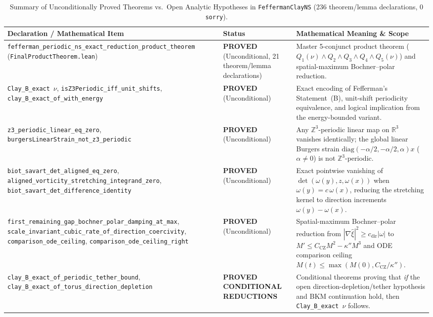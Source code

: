 \documentclass[11pt,a4paper]{article}
\theoremstyle{definition}
\begin{document}
\begin{table}[htbp]
\centering
\caption{Summary of Unconditionally Proved Theorems vs.\ Open Analytic Hypotheses in \texttt{FeffermanClayNS} (236 theorem/lemma declarations, 0 \texttt{sorry}).}
\label{tab:status}
\small
\begin{tabular}{p{}p{}p{}}
\toprule
\textbf{Declaration / Mathematical Item} & \textbf{Status} & \textbf{Mathematical Meaning \& Scope} \\
\midrule
\texttt{fefferman\_periodic\_ns\_exact\_reduction\_product\_theorem} (\texttt{FinalProductTheorem.lean}) & \textbf{PROVED} (Unconditional, 21 theorem/lemma declarations) & Master 5-conjunct product theorem ($Q_1(\nu) \wedge Q_2 \wedge Q_3 \wedge Q_4 \wedge Q_5(\nu)$) and spatial-maximum Bochner--polar reduction. \\
\addlinespace
\texttt{Clay\_B\_exact~$\nu$}, \texttt{isZ3Periodic\_iff\_unit\_shifts}, \texttt{clay\_B\_exact\_of\_with\_energy} & \textbf{PROVED} (Unconditional) & Exact encoding of Fefferman's Statement~(B), unit-shift periodicity equivalence, and logical implication from the energy-bounded variant. \\
\addlinespace
\texttt{z3\_periodic\_linear\_eq\_zero}, \texttt{burgersLinearStrain\_not\_z3\_periodic} & \textbf{PROVED} (Unconditional) & Any $\mathbb{Z}^3$-periodic linear map on $\mathbb{R}^3$ vanishes identically; the global linear Burgers strain $\mathrm{diag}(-\alpha/2,-\alpha/2,\alpha)x$ ($\alpha \neq 0$) is not $\mathbb{Z}^3$-periodic. \\
\addlinespace
\texttt{biot\_savart\_det\_aligned\_eq\_zero}, \texttt{aligned\_vorticity\_stretching\_integrand\_zero}, \texttt{biot\_savart\_det\_difference\_identity} & \textbf{PROVED} (Unconditional) & Exact pointwise vanishing of $\det(\omega(y), z, \omega(x))$ when $\omega(y) = c\,\omega(x)$, reducing the stretching kernel to direction increments $\omega(y) - \omega(x)$. \\
\addlinespace
\texttt{first\_remaining\_gap\_bochner\_polar\_damping\_at\_max}, \texttt{scale\_invariant\_cubic\_rate\_of\_direction\_coercivity}, \texttt{comparison\_ode\_ceiling}, \texttt{comparison\_ode\_ceiling\_right} & \textbf{PROVED} (Unconditional) & Spatial-maximum Bochner--polar reduction from $|\nabla \hat{\xi}|^2 \ge c_{\mathrm{dir}} |\omega|$ to $M' \le C_{\mathrm{CZ}} M^2 - \kappa'' M^3$ and ODE comparison ceiling $M(t) \le \max(M(0), C_{\mathrm{CZ}}/\kappa'')$. \\
\addlinespace
\texttt{clay\_B\_exact\_of\_periodic\_tether\_bound}, \texttt{clay\_B\_exact\_of\_torus\_direction\_depletion} & \textbf{PROVED CONDITIONAL REDUCTIONS} & Conditional theorems proving that \emph{if} the open direction-depletion/tether hypothesis and BKM continuation hold, then \texttt{Clay\_B\_exact~$\nu$} follows. \\

\end{tabular}
\end{table}
\end{document}

